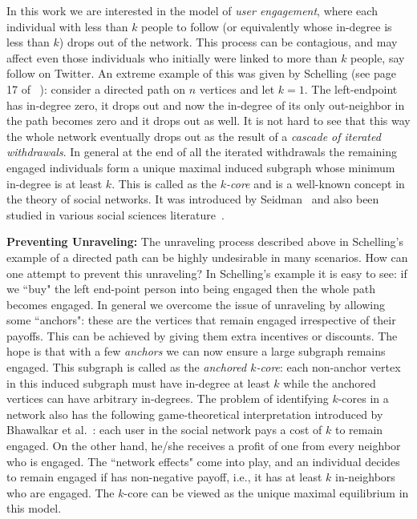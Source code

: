 \documentclass[11pt,a4paper]{article}
\begin{document}
In this work we are interested in the  model of \emph{user engagement}, where each individual with less than $k$ people to
follow (or equivalently whose in-degree is less than $k$) drops out of the network. This
process can be contagious, and may affect even those individuals who initially were linked to more than $k$ people, say follow
on Twitter. An extreme example of this was given by Schelling (see page 17 of ~\cite{schelling2006micromotives}): consider a
directed path on $n$ vertices and let $k=1$. The left-endpoint has in-degree zero, it drops out and now the in-degree of its
only out-neighbor in the path becomes zero and it drops out as well. It is not hard to see that this way the whole network
eventually drops out as the result of a \emph{cascade of iterated withdrawals}. In general at the end of all the iterated
withdrawals the remaining engaged individuals form a unique maximal induced subgraph whose minimum in-degree is at least $k$.
This is called as the \emph{$k$-core} and is a well-known concept in the theory of social networks. It was introduced by
Seidman~\cite{seidman-k-core} and also been studied in various social sciences
literature~\cite{chwe1999structure,chwe2000communication}.

\medskip
\noindent\textbf{Preventing Unraveling:} The unraveling process described above in Schelling's example of a directed path can
be  highly undesirable in many scenarios.  How can one attempt to prevent this unraveling? In Schelling's example it is easy
to see: if we ``buy" the left end-point person into being engaged then the whole path becomes engaged. In general we overcome
the issue of unraveling by allowing some ``anchors":  these are the vertices that remain engaged irrespective of their
payoffs. This can be achieved by giving them extra incentives or discounts. The hope is that with a few \emph{anchors} we can
now ensure a large subgraph remains engaged. This subgraph is  called as the \emph{anchored $k$-core}: each non-anchor vertex
in this induced subgraph must have in-degree at least $k$ while the anchored vertices can have arbitrary in-degrees. The
problem of identifying $k$-cores in a network also has the following  game-theoretical interpretation   introduced by
Bhawalkar et al.~\cite{BhawalkarKLRS12}: each user in the social network pays a cost of $k$ to remain engaged. On the other
hand, he/she receives a profit of one from every neighbor who is engaged. The ``network effects" come into play, and an
individual decides to remain engaged if has non-negative payoff, i.e., it has at least $k$ in-neighbors who are engaged. The
$k$-core can be viewed as the unique maximal equilibrium in this model.
\end{document}
